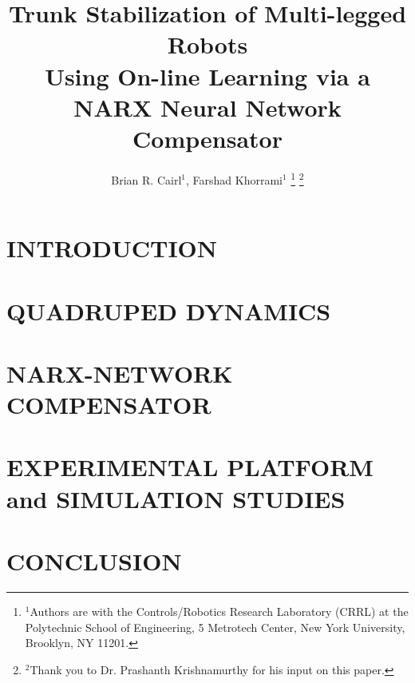 \documentclass[letterpaper, 10 pt, conference]{ieeeconf}  %
\title{\LARGE \bf
Trunk Stabilization of Multi-legged Robots \\
Using On-line Learning via a NARX Neural Network Compensator
}
\author{
Brian R. Cairl$^{1}$,
Farshad Khorrami$^{1}$
\thanks{%
	$^{1}$Authors are with the Controls/Robotics Research Laboratory (CRRL)
	at the  Polytechnic School of Engineering,
	5 Metrotech Center, New York University, Brooklyn, NY 11201.
}%
\thanks{
	$^{2}$Thank you to Dr. Prashanth Krishnamurthy for his input on this paper.
}
}%
\begin{document}
\newcommand{\TightSectionBeg}[1]{\vspace{0mm}\section{#1}\vspace{-0.1mm}}
\newcommand{\TightSectionEnd}{\vspace{-0.1mm}}
\newcommand{\PostImageCloseSpace}{\vspace{-4mm}}

\maketitle
\thispagestyle{empty}
\pagestyle{empty}


\begin{abstract}



\end{abstract}


\section{INTRODUCTION}

%
%
\TightSectionBeg{QUADRUPED DYNAMICS}

\TightSectionEnd
%
%
\TightSectionBeg{NARX-NETWORK COMPENSATOR}

\TightSectionEnd
%
%
\TightSectionBeg{EXPERIMENTAL PLATFORM and SIMULATION STUDIES}

\TightSectionEnd
%
%
\TightSectionBeg{CONCLUSION}

\TightSectionEnd
%
%
%
%




\end{document}
